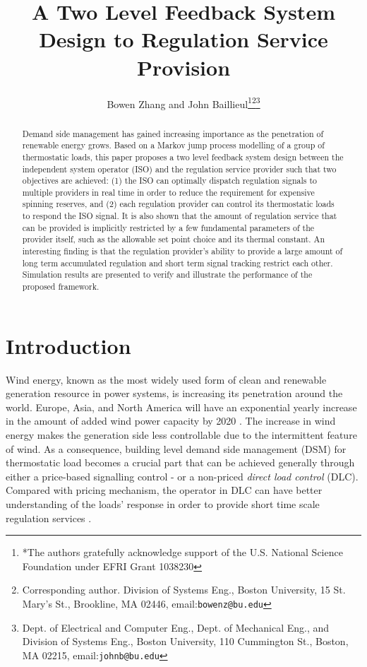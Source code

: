 \documentclass[journal]{IEEEtran}
\title{\LARGE \bf A Two Level Feedback System Design to Regulation Service Provision}
\author{Bowen Zhang and John Baillieul\thanks{*The authors gratefully acknowledge support of the U.S. National Science Foundation under EFRI Grant 1038230}\thanks{Corresponding author. Division of Systems Eng., Boston University, 15 St. Mary’s St., Brookline, MA 02446, email:{\tt\small bowenz@bu.edu}}\thanks{Dept. of Electrical and Computer Eng., Dept. of Mechanical Eng., and Division of Systems Eng., Boston University, 110 Cummington St., Boston, MA 02215, email:{\tt\small johnb@bu.edu}}}
\begin{document}
\maketitle
\thispagestyle{empty}
\pagestyle{empty}
\begin{abstract}
Demand side management has gained increasing importance as the penetration of renewable energy grows. Based on a Markov jump process modelling of a group of thermostatic loads, this paper proposes a two level feedback system design between the independent system operator (ISO) and the regulation service provider such that two objectives are achieved: (1) the ISO can optimally dispatch regulation signals to multiple providers in real time in order to reduce the requirement for expensive spinning reserves, and (2) each regulation provider can control its thermostatic loads to respond the ISO signal. It is also shown that the amount of regulation service that can be provided is implicitly restricted by a few fundamental parameters of the provider itself, such as the allowable set point choice and its thermal constant. An interesting finding is that the regulation provider's ability to provide a large amount of long term accumulated regulation and short term signal tracking restrict each other. Simulation results are presented to verify and illustrate the performance of the proposed framework. 
\end{abstract}

\section{Introduction}
\label{introduction}

Wind energy, known as the most widely used form of clean and renewable generation resource in power systems, is increasing its penetration around the world. Europe, Asia, and North America will have an exponential yearly increase in the amount of added wind power capacity by 2020 \cite{emerge}. The increase in wind energy makes the generation side less controllable due to the intermittent feature of wind. As a consequence, building level demand side management (DSM) for thermostatic load becomes a crucial part that can be achieved generally through either a price-based signalling control \cite{caram1}-\cite{albadi} or a non-priced \textit{direct load control} (DLC). Compared with pricing mechanism, the operator in DLC can have better understanding of the loads' response in order to provide short time scale regulation services \cite{duncan1}.
\end{document}
